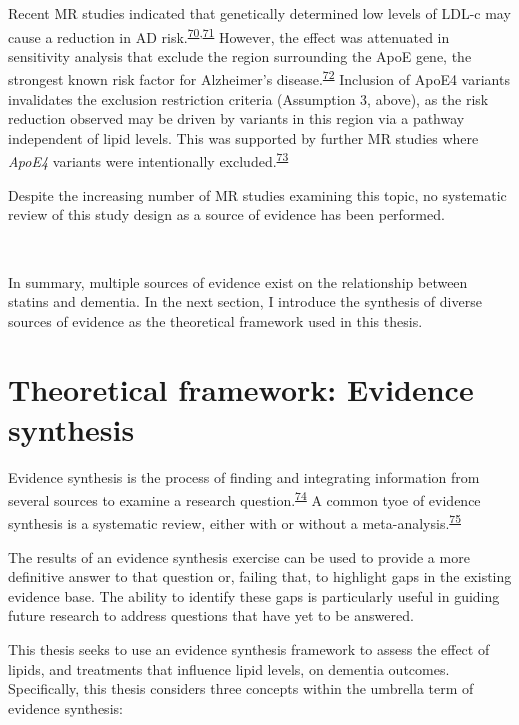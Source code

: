 \documentclass[a4paper, twoside]{templates/ociamthesis}
\begin{document}
Recent MR studies indicated that genetically determined low levels of LDL-c may cause a reduction in AD risk.\textsuperscript{\protect\hyperlink{ref-larsson2017}{70},\protect\hyperlink{ref-ostergaard2015}{71}} However, the effect was attenuated in sensitivity analysis that exclude the region surrounding the ApoE gene, the strongest known risk factor for Alzheimer's disease.\textsuperscript{\protect\hyperlink{ref-kim2009}{72}} Inclusion of ApoE4 variants invalidates the exclusion restriction criteria (Assumption 3, above), as the risk reduction observed may be driven by variants in this region via a pathway independent of lipid levels. This was supported by further MR studies where \emph{ApoE4} variants were intentionally excluded.\textsuperscript{\protect\hyperlink{ref-benn2017}{73}}

Despite the increasing number of MR studies examining this topic, no systematic review of this study design as a source of evidence has been performed.

~

In summary, multiple sources of evidence exist on the relationship between statins and dementia. In the next section, I introduce the synthesis of diverse sources of evidence as the theoretical framework used in this thesis.

\hypertarget{theoretical-framework-evidence-synthesis}{%
\section{Theoretical framework: Evidence synthesis}\label{theoretical-framework-evidence-synthesis}}

Evidence synthesis is the process of finding and integrating information from several sources to examine a research question.\textsuperscript{\protect\hyperlink{ref-donnelly2018}{74}} A common tyoe of evidence synthesis is a systematic review, either with or without a meta-analysis.\textsuperscript{\protect\hyperlink{ref-chandler2019chapter}{75}}

The results of an evidence synthesis exercise can be used to provide a more definitive answer to that question or, failing that, to highlight gaps in the existing evidence base. The ability to identify these gaps is particularly useful in guiding future research to address questions that have yet to be answered.

This thesis seeks to use an evidence synthesis framework to assess the effect of lipids, and treatments that influence lipid levels, on dementia outcomes.
Specifically, this thesis considers three concepts within the umbrella term of evidence synthesis:
\end{document}
